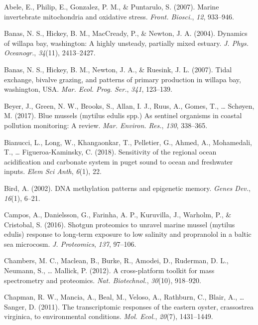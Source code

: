 \documentclass [11pt, proquest] {uwthesis}[2015/03/03]
\newlength{\cslhangindent}
\newenvironment{CSLReferences}%
{\setlength{\parindent}{0pt}%
\everypar{\setlength{\hangindent}{\cslhangindent}}\ignorespaces}%
{\par}
\begin{document}
\hypertarget{refs}{}
\begin{CSLReferences}{1}{0}
\leavevmode\hypertarget{ref-Abele2007}{}%
Abele, E., Philip, E., Gonzalez, P. M., \& Puntarulo, S. (2007). Marine invertebrate mitochondria and oxidative stress. \emph{Front. Biosci.}, \emph{12}, 933--946.

\leavevmode\hypertarget{ref-Banas2004}{}%
Banas, N. S., Hickey, B. M., MacCready, P., \& Newton, J. A. (2004). Dynamics of willapa bay, washington: A highly unsteady, partially mixed estuary. \emph{J. Phys. Oceanogr.}, \emph{34}(11), 2413--2427.

\leavevmode\hypertarget{ref-Banas2007}{}%
Banas, N. S., Hickey, B. M., Newton, J. A., \& Ruesink, J. L. (2007). Tidal exchange, bivalve grazing, and patterns of primary production in willapa bay, washington, {USA}. \emph{Mar. Ecol. Prog. Ser.}, \emph{341}, 123--139.

\leavevmode\hypertarget{ref-Beyer2017}{}%
Beyer, J., Green, N. W., Brooks, S., Allan, I. J., Ruus, A., Gomes, T., \ldots{} Schøyen, M. (2017). Blue mussels (mytilus edulis spp.) As sentinel organisms in coastal pollution monitoring: A review. \emph{Mar. Environ. Res.}, \emph{130}, 338--365.

\leavevmode\hypertarget{ref-Bianucci2018}{}%
Bianucci, L., Long, W., Khangaonkar, T., Pelletier, G., Ahmed, A., Mohamedali, T., \ldots{} Figueroa-Kaminsky, C. (2018). Sensitivity of the regional ocean acidification and carbonate system in puget sound to ocean and freshwater inputs. \emph{Elem Sci Anth}, \emph{6}(1), 22.

\leavevmode\hypertarget{ref-Bird2002}{}%
Bird, A. (2002). {DNA} methylation patterns and epigenetic memory. \emph{Genes Dev.}, \emph{16}(1), 6--21.

\leavevmode\hypertarget{ref-Campos2016}{}%
Campos, A., Danielsson, G., Farinha, A. P., Kuruvilla, J., Warholm, P., \& Cristobal, S. (2016). Shotgun proteomics to unravel marine mussel (mytilus edulis) response to long-term exposure to low salinity and propranolol in a baltic sea microcosm. \emph{J. Proteomics}, \emph{137}, 97--106.

\leavevmode\hypertarget{ref-Chambers2012}{}%
Chambers, M. C., Maclean, B., Burke, R., Amodei, D., Ruderman, D. L., Neumann, S., \ldots{} Mallick, P. (2012). A cross-platform toolkit for mass spectrometry and proteomics. \emph{Nat. Biotechnol.}, \emph{30}(10), 918--920.

\leavevmode\hypertarget{ref-Chapman2011}{}%
Chapman, R. W., Mancia, A., Beal, M., Veloso, A., Rathburn, C., Blair, A., \ldots{} Sanger, D. (2011). The transcriptomic responses of the eastern oyster, crassostrea virginica, to environmental conditions. \emph{Mol. Ecol.}, \emph{20}(7), 1431--1449.


\end{CSLReferences}
\end{document}

